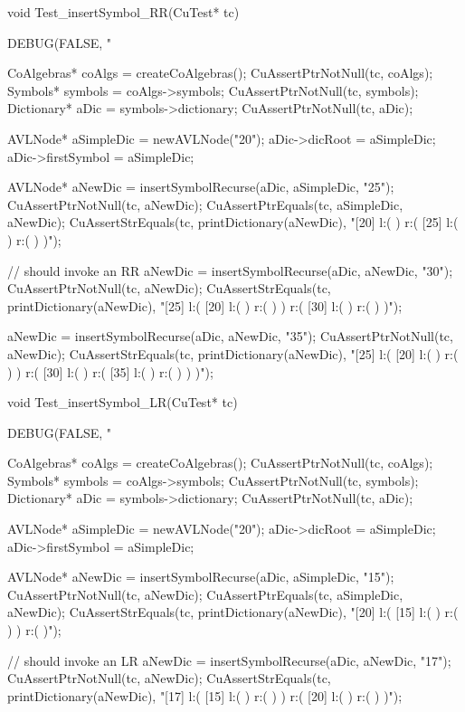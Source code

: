 void Test_insertSymbol_RR(CuTest* tc) {
  DEBUG(FALSE, "\n%

  CoAlgebras* coAlgs = createCoAlgebras();
  CuAssertPtrNotNull(tc, coAlgs);
  Symbols* symbols = coAlgs->symbols;
  CuAssertPtrNotNull(tc, symbols);
  Dictionary* aDic = symbols->dictionary;
  CuAssertPtrNotNull(tc, aDic);

  AVLNode* aSimpleDic = newAVLNode("20");
  aDic->dicRoot     = aSimpleDic;
  aDic->firstSymbol = aSimpleDic;

  AVLNode* aNewDic = insertSymbolRecurse(aDic, aSimpleDic, "25");
  CuAssertPtrNotNull(tc, aNewDic);
  CuAssertPtrEquals(tc, aSimpleDic, aNewDic);
  CuAssertStrEquals(tc, printDictionary(aNewDic),
  "[20] l:(  ) r:( [25] l:(  ) r:(  )  )");

  // should invoke an RR
  aNewDic = insertSymbolRecurse(aDic, aNewDic, "30");
  CuAssertPtrNotNull(tc, aNewDic);
  CuAssertStrEquals(tc, printDictionary(aNewDic),
  "[25] l:( [20] l:(  ) r:(  )  ) r:( [30] l:(  ) r:(  )  )");

  aNewDic = insertSymbolRecurse(aDic, aNewDic, "35");
  CuAssertPtrNotNull(tc, aNewDic);
  CuAssertStrEquals(tc, printDictionary(aNewDic),
  "[25] l:( [20] l:(  ) r:(  )  ) r:( [30] l:(  ) r:( [35] l:(  ) r:(  )  )  )");
}

void Test_insertSymbol_LR(CuTest* tc) {
  DEBUG(FALSE, "\n%

  CoAlgebras* coAlgs = createCoAlgebras();
  CuAssertPtrNotNull(tc, coAlgs);
  Symbols* symbols = coAlgs->symbols;
  CuAssertPtrNotNull(tc, symbols);
  Dictionary* aDic = symbols->dictionary;
  CuAssertPtrNotNull(tc, aDic);

  AVLNode* aSimpleDic = newAVLNode("20");
  aDic->dicRoot     = aSimpleDic;
  aDic->firstSymbol = aSimpleDic;

  AVLNode* aNewDic = insertSymbolRecurse(aDic, aSimpleDic, "15");
  CuAssertPtrNotNull(tc, aNewDic);
  CuAssertPtrEquals(tc, aSimpleDic, aNewDic);
  CuAssertStrEquals(tc, printDictionary(aNewDic),
  "[20] l:( [15] l:(  ) r:(  )  ) r:(  )");

  // should invoke an LR
  aNewDic = insertSymbolRecurse(aDic, aNewDic, "17");
  CuAssertPtrNotNull(tc, aNewDic);
  CuAssertStrEquals(tc, printDictionary(aNewDic),
  "[17] l:( [15] l:(  ) r:(  )  ) r:( [20] l:(  ) r:(  )  )");
}

